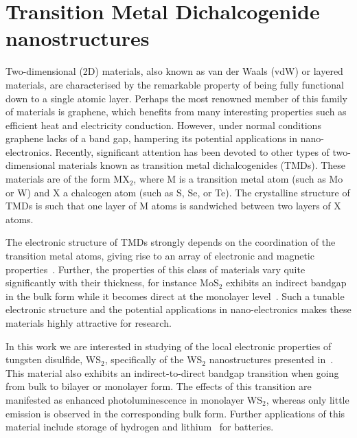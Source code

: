 \section{Transition Metal Dichalcogenide nanostructures}
\label{sec:tmd}

Two-dimensional (2D) materials, also known as van der Waals (vdW) or layered materials,
are characterised by the remarkable property of being fully functional down to a single atomic layer.
%
Perhaps the most renowned member of this family of materials is graphene,
which benefits from many interesting properties such as efficient heat and electricity
conduction.
%
However, under normal conditions graphene lacks of a band gap, hampering its potential
applications in nano-electronics.
%
Recently, significant attention has been devoted to other types
of two-dimensional materials known as  transition metal dichalcogenides (TMDs).
%
These materials are of the form MX$_2$, where M is a 
transition metal atom (such as Mo or W) and X a chalcogen atom (such as S, Se, or Te). 
%
The crystalline structure of TMDs is such that
one layer of M atoms is sandwiched between two layers of X atoms.

The electronic structure of TMDs strongly depends on the coordination 
of the transition metal atoms, giving rise to an array of electronic
and magnetic properties~\cite{Chhowalla:2013}.
%
Further, the properties of this class of materials vary quite significantly
with their thickness, for instance MoS$_2$ exhibits an indirect bandgap
in the bulk form while it becomes direct at the monolayer level~\cite{Splendiani:2010}.
%
Such a tunable electronic structure and the potential applications in
nano-electronics makes these materials highly attractive for research. 

In this work we are interested in studying of the local electronic
properties of tungsten disulfide, WS$_2$, specifically of the
WS$_2$ nanostructures presented in~\cite{SabryaWS2}.
%
This material also exhibits an indirect-to-direct bandgap transition when going
from bulk to bilayer or monolayer form.
%
The effects of this transition are manifested as enhanced
photoluminescence in monolayer WS$_2$, whereas only little emission is observed in
the corresponding bulk form.
%
Further applications of this material include storage of hydrogen 
and lithium~\cite{Bhandavat:2012} for batteries.

